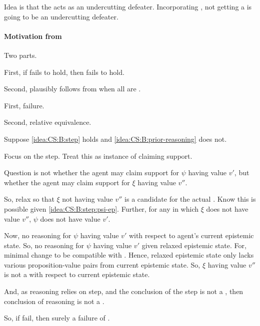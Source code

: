 \begin{note}
  \color{red}
  Idea is that the \epVAd{} \world{} acts as an undercutting defeater.
  Incorporating \ideaCSA{}, not getting a \sink{} is going to be an undercutting defeater.
\end{note}

\paragraph{Motivation from \ideaCSA{}}

\begin{note}
  Two parts.

  First, if \ideaCSB{} fails to hold, then \ideaCSA{} fails to hold.

  Second, \ideaCSA{} plausibly follows from \ideaCSB{} when all \epPAd{}  are \epVAd{}.
\end{note}

\begin{note}
  First, failure.
\end{note}

\begin{note}
  Second, relative equivalence.
\end{note}

\begin{note}
  Suppose \ref{idea:CS:B:step} holds and \ref{idea:CS:B:prior-reasoning} does not.


  Focus on the step.
  Treat this as instance of claiming support.

  Question is not whether the agent may claim support for \(\psi\) having value \(v'\), but whether the agent may claim support for \(\xi\) having value \(v''\).

  So, relax so that \(\xi\) not having value \(v''\) is a candidate for the actual \world{}.
  Know this is possible given \ref{idea:CS:B:step:psi-ep}.
  Further, for any \epVAd{} \world{} in which \(\xi\) does not have value \(v''\), \(\psi\) does not have value \(v'\).

  Now, no reasoning for \(\psi\) having value \(v'\) with respect to agent's current epistemic state.
  So, no reasoning for \(\psi\) having value \(v'\) given relaxed epistemic state.
  For, minimal change to be compatible with \epVAd{} \world{}.
  Hence, relaxed epistemic state only lacks various proposition-value pairs from current epistemic state.
  So, \(\xi\) having value \(v''\) is not a \sink{} with respect to current epistemic state.

  And, as reasoning relies on step, and the conclusion of the step is not a \sink{}, then conclusion of reasoning is not a \sink{}.

  So, if fail, then surely a failure of \ideaCSA{}.
\end{note}

